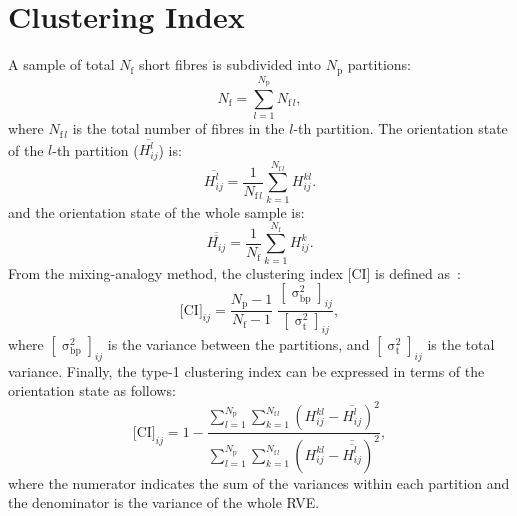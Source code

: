 \section{Clustering Index}
A sample of total $N_\text{f}$ short fibres is subdivided into $N_\text{p}$ partitions:
\begin{equation}
N_\text{f}=\sum_{l=1}^{N_\text{p}}N_{\text{f}\,l},
\end{equation}
where $N_{\text{f}\,l}$ is the total number of fibres in the $l$-th partition. The orientation state of the $l$-th partition ($\overline{H_{ij}^l}$) is:
\begin{equation}
\overline{H_{ij}^l}=\frac{1}{N_{\text{f}\,l}}\sum_{k=1}^{N_{\text{f}\,l}}H_{ij}^{kl}.
\end{equation}
and the orientation state of the whole sample is:
\begin{equation}
\overline{\overline{H_{ij}}}=\frac{1}{N_\text{f}}\sum_{k=1}^{N_\text{f}}H_{ij}^k.
\end{equation}
From the mixing-analogy method, the clustering index $\text{[CI]}$ is defined as~\autocite{Ranganathan.1990}:
\begin{equation}
{\text{[CI]}}_{ij}=\frac{N_\text{p}-1}{N_\text{f}-1}\;\frac{[\upsigma_\text{bp}^2]_{ij}}{[\upsigma_\text{t}^2]_{ij}},
\end{equation}
where $[\upsigma_\text{bp}^2]_{ij}$ is the variance between the partitions, and $[\upsigma_\text{t}^2]_{ij}$ is the total variance. Finally, the type-1 clustering index can be expressed in terms of the orientation state as follows:
\begin{equation}
{\text{[CI]}}_{ij}=1-\dfrac{
\sum\limits_{l=1}^{N_\text{p}}\sum\limits_{k=1}^{N_{\text{f}\,l}}(H_{ij}^{kl}-\overline{H_{ij}^l})^2
}{
\sum\limits_{l=1}^{N_\text{p}}\sum\limits_{k=1}^{N_{\text{f}\,l}}(H_{ij}^{kl}-\overline{\overline{H_{ij}^l}})^2
},
\end{equation}
where the numerator indicates the sum of the variances within each partition and the denominator is the variance of the whole RVE.
\red
